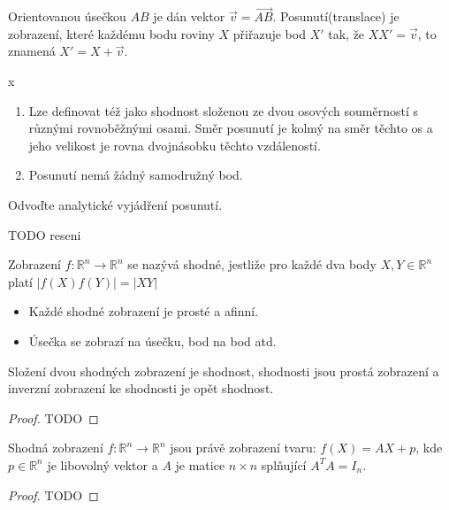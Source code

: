 \documentclass[../main.tex]{subfiles}
\begin{document}
    \begin{definition}[Posunutí]
        Orientovanou úsečkou $AB$ je dán vektor $\vec{v} = \vec{AB}$. Posunutí(translace)
        je zobrazení, které každému bodu roviny $X$ přiřazuje bod $X'$ tak,
        že $XX' = \vec{v}$, to znamená $X' = X + \vec{v}$.
    \end{definition}

    \begin{remark} {\color{white} x}
        \begin{enumerate}
            \item Lze definovat též jako shodnost složenou ze dvou osových souměrností
            s různými rovnoběžnými osami. Směr posunutí je kolmý na směr těchto os a jeho velikost je
            rovna dvojnásobku těchto vzdáleností.
            \item Posunutí nemá žádný samodružný bod.
        \end{enumerate}
    \end{remark}

    \begin{example}
        Odvoďte analytické vyjádření posunutí.

        TODO reseni
    \end{example}

    \begin{definition}
        Zobrazení $f: \mathbb{R}^n \to \mathbb{R}^n$ se nazývá shodné, jestliže pro každé dva body
        $X,Y \in \mathbb{R}^n$ platí $|f(X)f(Y)| = |XY|$

        \begin{itemize}
            \item Každé shodné zobrazení je prosté a afinní.
            \item Úsečka se zobrazí na úsečku, bod na bod atd.
        \end{itemize}
    \end{definition}

    \begin{theorem}
        Složení dvou shodných zobrazení je shodnost, shodnosti jsou prostá zobrazení a inverzní
        zobrazení ke shodnosti je opět shodnost.
    \end{theorem}
    \begin{proof}
        TODO
    \end{proof}

    \begin{theorem}
        Shodná zobrazení $f: \mathbb{R}^n \to \mathbb{R}^n$ jsou právě zobrazení tvaru:
        $ f(X) = AX + p $, kde $p \in \mathbb{R}^n$ je libovolný vektor a $A$ je matice
        $n \times n$ splňující $A^TA = I_n$.
    \end{theorem}
    \begin{proof}
        TODO
    \end{proof}
\end{document}
